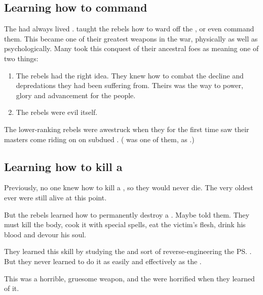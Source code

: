 \subsection{Learning how to command \umbrae}
The \Merkyrans{} had always lived . 
\Semiza{} taught the rebels how to ward off the \umbrae, or even command them. 
This became one of their greatest weapons in the war, physically as well as psychologically. 
Many took this conquest of their ancestral foes as meaning one of two things: 

\begin{enumerate}
  \item 
    The rebels had the right idea. 
    They knew how to combat the decline and depredations they had been suffering from. 
    Theirs was the way to power, glory and advancement for the \resphan{} people. 
  \item 
    The rebels were evil itself. 
\end{enumerate}

The lower-ranking rebels were awestruck when they for the first time saw their masters come riding on on subdued \umbrae. 
(\Achsah{} was one of them, as .)









\subsection{Learning how to kill a \resphan}
Previously, no one knew how to kill a \resphan, so they would never die. 
The very oldest \resphain{} ever were still alive at this point. 

But the rebels learned how to permanently destroy a \resphan. 
Maybe \Semiza{} told them. 
They must kill the body, cook it with special spells, eat the victim's flesh, drink his blood and devour his soul. 

They learned this skill by studying the  and sort of reverse-engineering the \ps{\umbrae} . 
But they never learned to do it as easily and effectively as the \umbrae{}. 

This was a horrible, gruesome weapon, and the \Merkyrans{} were horrified when they learned of it. 









